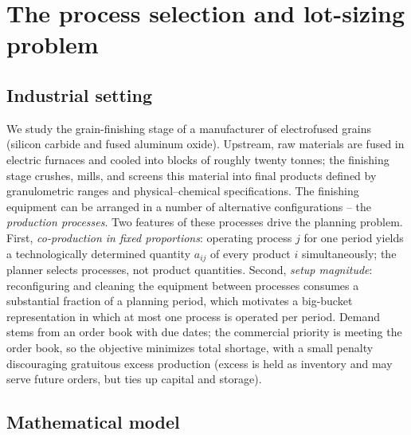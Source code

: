 \section{The process selection and lot-sizing problem}
\label{sec:problem}

\subsection{Industrial setting}
\label{sec:setting}

We study the grain-finishing stage of a manufacturer of electrofused
grains (silicon carbide and fused aluminum oxide). Upstream, raw
materials are fused in electric furnaces and cooled into blocks of
roughly twenty tonnes; the finishing stage crushes, mills, and screens
this material into final products defined by granulometric ranges and
physical--chemical specifications. The finishing equipment can be
arranged in a number of alternative configurations -- the
\emph{production processes}. Two features of these processes drive the
planning problem. First, \emph{co-production in fixed proportions}:
operating process $j$ for one period yields a technologically
determined quantity $a_{ij}$ of every product $i$ simultaneously; the
planner selects processes, not product quantities. Second,
\emph{setup magnitude}: reconfiguring and cleaning the equipment
between processes consumes a substantial fraction of a planning
period, which motivates a big-bucket representation in which at most
one process is operated per period. Demand stems from an order book
with due dates; the commercial priority is meeting the order book, so
the objective minimizes total shortage, with a small penalty
discouraging gratuitous excess production (excess is held as
inventory and may serve future orders, but ties up capital and
storage). 

\subsection{Mathematical model}
\label{sec:model}

